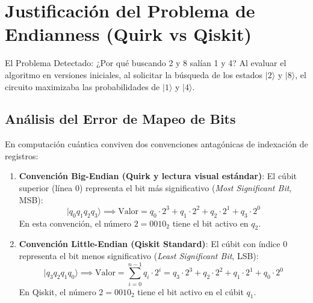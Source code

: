 \documentclass[11pt,a4paper]{article}
\begin{document}
\section{Justificación del Problema de Endianness (Quirk vs Qiskit)}

\begin{warningbox}{El Problema Detectado: ¿Por qué buscando 2 y 8 salían 1 y 4?}
Al evaluar el algoritmo en versiones iniciales, al solicitar la búsqueda de los estados $|2\rangle$ y $|8\rangle$, el circuito maximizaba las probabilidades de $|1\rangle$ y $|4\rangle$.
\end{warningbox}

\subsection{Análisis del Error de Mapeo de Bits}
En computación cuántica conviven dos convenciones antagónicas de indexación de registros:
\begin{enumerate}
    \item \textbf{Convención Big-Endian (Quirk y lectura visual estándar)}:
    El cúbit superior (línea 0) representa el bit más significativo (\textit{Most Significant Bit}, MSB):
    \begin{equation}
        |q_0 q_1 q_2 q_3\rangle \implies \text{Valor} = q_0 \cdot 2^3 + q_1 \cdot 2^2 + q_2 \cdot 2^1 + q_3 \cdot 2^0
    \end{equation}
    En esta convención, el número $2 = 0010_2$ tiene el bit activo en $q_2$.
    
    \item \textbf{Convención Little-Endian (Qiskit Standard)}:
    El cúbit con índice $0$ representa el bit menos significativo (\textit{Least Significant Bit}, LSB):
    \begin{equation}
        |q_3 q_2 q_1 q_0\rangle \implies \text{Valor} = \sum_{i=0}^{n-1} q_i \cdot 2^i = q_3 \cdot 2^3 + q_2 \cdot 2^2 + q_1 \cdot 2^1 + q_0 \cdot 2^0
    \end{equation}
    En Qiskit, el número $2 = 0010_2$ tiene el bit activo en el cúbit $q_1$.
\end{enumerate}

\begin{table}[H]
\centering
\caption{Comparativa de representación de estados según convención de ordenación de cúbits.}
\label{tab:endianness}
\end{table}
\end{document}

